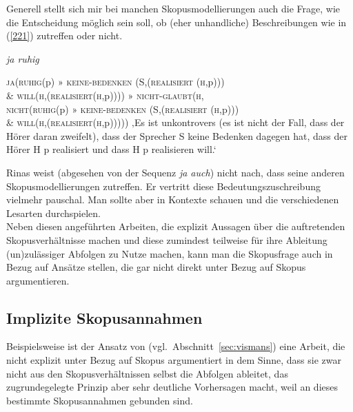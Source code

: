 Generell stellt sich mir bei manchen Skopusmodellierungen auch die Frage, wie die Entscheidung möglich sein soll, ob (eher unhandliche) Beschreibungen wie in (\ref{221}) zutreffen oder nicht.
	
\begin{exe}
	\ex\label{221} 
		\textit{ja ruhig}
		\begin{xlist}	
			\ex\label{221a} \textsc{ja}(\textsc{ruhig}(p) » \textsc{keine-bedenken} (\textsc{S},(\textsc{realisiert} (\textsc{h},p)))\\ \& \textsc{will}(\textsc{h},(\textsc{realisiert}(\textsc{h},p))))
			» \textsc{nicht-glaubt}(\textsc{h},\\ \textsc{nicht}(\textsc{ruhig}(p) » \textsc{keine-bedenken} (\textsc{S},(\textsc{realisiert} (\textsc{h},p))) \\ \& \textsc{will}(\textsc{h},(\textsc{realisiert}(\textsc{h},p)))))		
			\ex\label{221b} ‚Es ist unkontrovers (es ist nicht der Fall, dass der Hörer daran zweifelt), dass der Sprecher S keine Bedenken dagegen hat, dass der Hörer H p realisiert und dass H p realisieren will.‘
			\hfill\hbox{\citet[436]{Rinas2007}}
		\end{xlist}
\end{exe}
Rinas weist (abgesehen von der Sequenz \textit{ja auch}) nicht nach, dass seine anderen Skopusmodellierungen zutreffen. Er vertritt diese Bedeutungszuschreibung viel\-mehr pauschal. Man sollte aber in Kontexte schauen und die verschiedenen Lesarten durchspielen.\\

\noindent
Neben diesen angeführten Arbeiten, die explizit Aussagen über die auftretenden Skopusverhältnisse machen und diese zumindest teilweise für ihre Ableitung (un)zulässiger Abfolgen zu Nutze machen, kann man die Skopusfrage auch in Bezug auf Ansätze stellen, die gar nicht direkt unter Bezug auf Skopus argumentieren.

\subsection{Implizite Skopusannahmen}
\label{sec:skopusimp}
Beispielsweise ist der Ansatz von \citet{Vismans1994} (vgl.\ Abschnitt~\ref{sec:vismans}) eine Arbeit, die nicht explizit unter Bezug auf Skopus argumentiert in dem Sinne, dass sie zwar nicht aus den Skopusverhältnissen selbst die Abfolgen ableitet, das zugrundegelegte Prinzip aber sehr deutliche Vorhersagen macht, weil an dieses bestimmte Skopusannahmen  gebunden sind.

